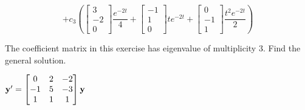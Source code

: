 \documentclass{ximera}
\begin{document}
\begin{problem}
\begin{solution}
$$+c_3\left( \begin{bmatrix}3\\-2\\0 \end{bmatrix}\frac{e^{-2t} }{4}+ \begin{bmatrix}-1\\1\\0 \end{bmatrix}t
e^{-2t}+ \begin{bmatrix}0\\-1\\1 \end{bmatrix}\frac{t^2e^{-2t} }{2}\right)$$


\end{solution}
 \end{problem}

 \begin{problem}\label{exer:10.5.27} 
 The coefficient matrix in this exercise
has eigenvalue of multiplicity $3$. Find the
general solution.

$ {\bf y}'
= \begin{bmatrix}0&2&-2\\-1&5&-3\\1&1&1\end{bmatrix}{\bf y}$
 \end{problem}
\end{document}
